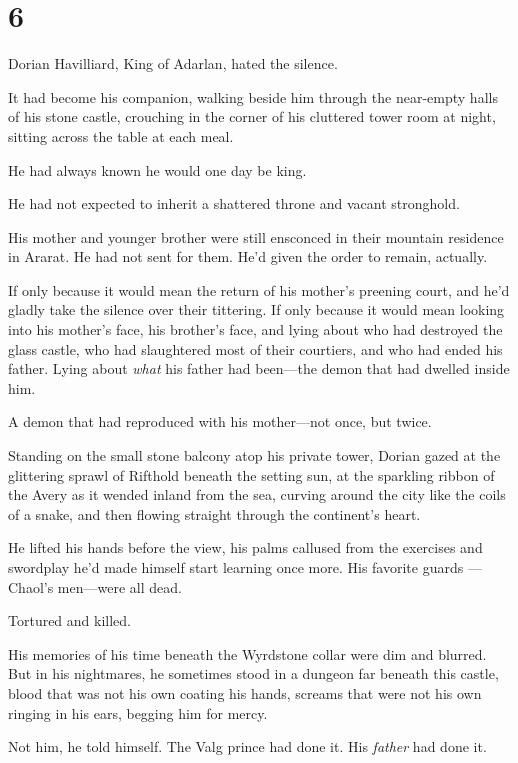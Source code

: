 
\chapter{6}

Dorian Havilliard, King of Adarlan, hated the silence.

It had become his companion, walking beside him through the near-empty halls of his stone castle, crouching in the corner of his cluttered tower room at night, sitting across the table at each meal.

He had always known he would one day be king.

He had not expected to inherit a shattered throne and vacant stronghold.

His mother and younger brother were still ensconced in their mountain residence in Ararat.
He had not sent for them.
He'd given the order to remain, actually.

If only because it would mean the return of his mother's preening court, and he'd gladly take the silence over their tittering.
If only because it would mean looking into his mother's face, his brother's face, and lying about who had destroyed the glass castle, who had slaughtered most of their courtiers, and who had ended his father.
Lying about \emph{what} his father had been---the demon that had dwelled inside him.

A demon that had reproduced with his mother---not once, but twice.

Standing on the small stone balcony atop his private tower, Dorian gazed at the glittering sprawl of Rifthold beneath the setting sun, at the sparkling ribbon of the Avery as it wended inland from the sea, curving around the city like the coils of a snake, and then flowing straight through the continent's heart.

He lifted his hands before the view, his palms callused from the exercises and swordplay he'd made himself start learning once more.
His favorite guards ---Chaol's men---were all dead.

Tortured and killed.

His memories of his time beneath the Wyrdstone collar were dim and blurred.
But in his nightmares, he sometimes stood in a dungeon far beneath this castle, blood that was not his own coating his hands, screams that were not his own ringing in his ears, begging him for mercy.

Not him, he told himself.
The Valg prince had done it.
His \emph{father}
had done it.

